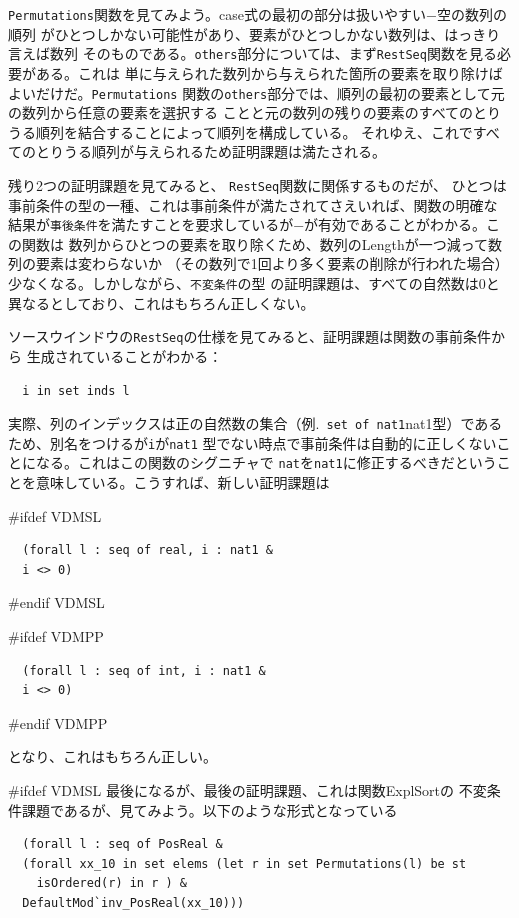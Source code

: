 \documentclass[\pformat,12pt]{article}
\newcommand{\aaa}{\tt }
\newcommand{\guicmd}[1]{{\sf #1}}
\newcommand{\guicmd}[1]{{\gt #1}}
\begin{document}
{\aaa Permutations}関数を見てみよう。case式の最初の部分は扱いやすい−空の数列の順列
がひとつしかない可能性があり、要素がひとつしかない数列は、はっきり言えば数列
そのものである。{\aaa others}部分については、まず{\aaa RestSeq}関数を見る必要がある。これは
単に与えられた数列から与えられた箇所の要素を取り除けばよいだけだ。{\aaa Permutations}
関数の{\aaa others}部分では、順列の最初の要素として元の数列から任意の要素を選択する
ことと元の数列の残りの要素のすべてのとりうる順列を結合することによって順列を構成している。
それゆえ、これですべてのとりうる順列が与えられるため証明課題は満たされる。

残り2つの証明課題を見てみると、
{\aaa RestSeq}関数に関係するものだが、
ひとつは事前条件の型の一種、これは事前条件が満たされてさえいれば、関数の明確な
結果が{\aaa 事後条件}を満たすことを要求しているが−が有効であることがわかる。この関数は
数列からひとつの要素を取り除くため、数列のLengthが一つ減って数列の要素は変わらないか
（その数列で1回より多く要素の削除が行われた場合）少なくなる。しかしながら、{\aaa 不変条件}の型
の証明課題は、すべての自然数は0と異なるとしており、これはもちろん正しくない。

\guicmd{ソースウインドウ}の{\aaa RestSeq}の仕様を見てみると、証明課題は関数の事前条件から
生成されていることがわかる：

\begin{verbatim}
  i in set inds l
\end{verbatim}

実際、列のインデックスは正の自然数の集合（例.\ \verb+set of nat1+nat1型）であるため、別名をつけるが{\aaa i}が{\aaa nat1}
型でない時点で事前条件は自動的に正しくないことになる。これはこの関数のシグニチャで
{\aaa nat}を{\aaa nat1}に修正するべきだということを意味している。こうすれば、新しい証明課題は

#ifdef VDMSL
\begin{verbatim}
  (forall l : seq of real, i : nat1 &
  i <> 0)
\end{verbatim}
#endif VDMSL

#ifdef VDMPP
\begin{verbatim}
  (forall l : seq of int, i : nat1 &
  i <> 0)
\end{verbatim}
#endif VDMPP

となり、これはもちろん正しい。

#ifdef VDMSL
最後になるが、最後の証明課題、これは関数\guicmd{ExplSort}の
不変条件課題であるが、見てみよう。以下のような形式となっている

\begin{verbatim}
  (forall l : seq of PosReal &
  (forall xx_10 in set elems (let r in set Permutations(l) be st 
    isOrdered(r) in r ) &
  DefaultMod`inv_PosReal(xx_10)))
\end{verbatim}
\end{document}
